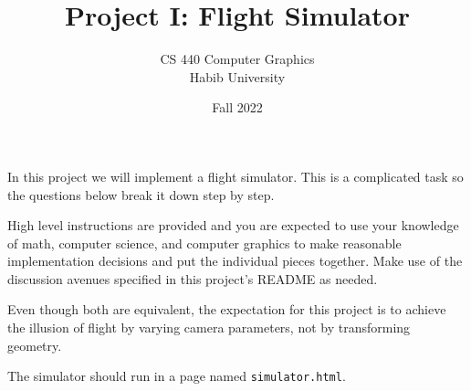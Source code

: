 \documentclass[addpoints]{exam}
\title{Project I: Flight Simulator}
\author{CS 440 Computer Graphics\\Habib University}
\date{Fall 2022}
\begin{document}
\maketitle
\thispagestyle{empty}

In this project we will implement a flight simulator. This is a complicated task so the questions below break it down step by step.

High level instructions are provided and you are expected to use your knowledge of math, computer science, and computer graphics to make reasonable implementation decisions and put the individual pieces together. Make use of the discussion avenues specified in this project's README as needed.

Even though both are equivalent, the expectation for this project is to achieve the illusion of flight by varying camera parameters, not by transforming geometry.

The simulator should run in a page named \texttt{simulator.html}.
\end{document}
